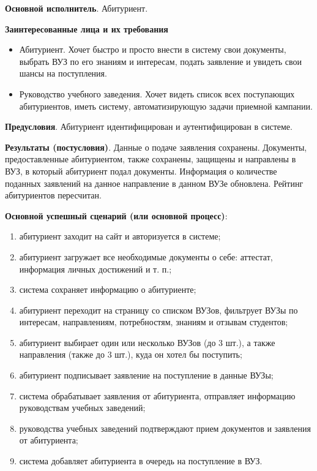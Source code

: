 \documentclass[a4paper, 14pt]{extarticle}
\begin{document}
{
  \setlength{\parindent}{0pt}

  \textbf{Основной исполнитель}. Абитуриент.

  \textbf{Заинтересованные лица и их требования}
  \begin{itemize}
    \item Абитуриент. Хочет быстро и просто внести в систему свои документы,
    выбрать ВУЗ по его знаниям и интересам, подать заявление и увидеть свои
    шансы на поступления.
    \item Руководство учебного заведения. Хочет видеть список всех поступающих
    абитуриентов, иметь систему, автоматизирующую задачи приемной кампании.
  \end{itemize}

  \textbf{Предусловия}. Абитуриент идентифицирован и аутентифицирован в системе.

  \textbf{Результаты (постусловия)}. Данные о подаче заявления сохранены.
  Документы, предоставленные абитуриентом, также сохранены, защищены и
  направлены в ВУЗ, в который абитуриент подал документы. Информация о
  количестве поданных заявлений на данное направление в данном ВУЗе обновлена.
  Рейтинг абитуриентов пересчитан.

  \textbf{Основной успешный сценарий (или основной процесс)}:
  \begin{enumerate}
    \item абитуриент заходит на сайт и авторизуется в системе;
    \item абитуриент загружает все необходимые документы о себе: аттестат,
    информация личных достижений и т. п.;
    \item система сохраняет информацию о абитуриенте;
    \item абитуриент переходит на страницу со списком ВУЗов, фильтрует
    ВУЗы по интересам, направлениям, потребностям, знаниям и отзывам студентов;
    \item абитуриент выбирает один или несколько ВУЗов (до 3 шт.), а также
    направления (также до 3 шт.), куда он хотел бы поступить;
    \item абитуриент подписывает заявление на поступление в данные ВУЗы;
    \item система обрабатывает заявления от абитуриента, отправляет информацию
    руководствам учебных заведений;
    \item руководства учебных заведений подтверждают прием документов и
    заявления от абитуриента;
    \item система добавляет абитуриента в очередь на поступление в ВУЗ.
  \end{enumerate}

}
\end{document}
